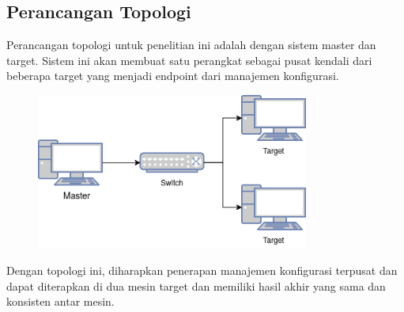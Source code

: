 \documentclass[10pt,twoside]{report}
\begin{document}
\begin{adjustwidth}{20pt}{}
	\subsection{Perancangan Topologi}
	\begin{adjustwidth}{20pt}{}
		\hspace\parindent
		Perancangan topologi untuk penelitian ini adalah dengan sistem master dan
		target. Sistem ini akan membuat satu perangkat sebagai pusat kendali dari
		beberapa target yang menjadi endpoint dari manajemen konfigurasi.\\
		\begin{figure}[H]
			\centering
			\includegraphics[width=0.8\textwidth]{images/base-topology.png}
		\end{figure}
		Dengan topologi ini, diharapkan penerapan manajemen konfigurasi terpusat
		dan dapat diterapkan di dua mesin target dan memiliki hasil akhir yang sama
		dan konsisten antar mesin.\\
	\end{adjustwidth}
\end{adjustwidth}
\end{document}
